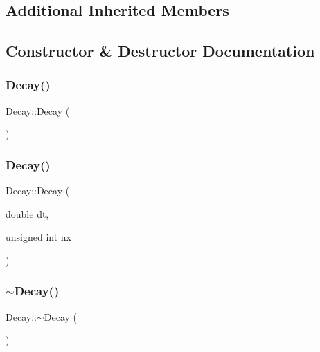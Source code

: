 \subsection*{Additional Inherited Members}


\subsection{Constructor \& Destructor Documentation}
\mbox{\label{class_decay_a603fb8ea4172c2c80c8779ad301b6a4f}} 
\subsubsection{\texorpdfstring{Decay()}{Decay()}\hspace{0.1cm}{\footnotesize\ttfamily [1/2]}}
{\footnotesize\ttfamily Decay\+::\+Decay (\begin{DoxyParamCaption}{ }\end{DoxyParamCaption})}

\mbox{\label{class_decay_a694e3127e3dd89affb983e9565781062}} 
\subsubsection{\texorpdfstring{Decay()}{Decay()}\hspace{0.1cm}{\footnotesize\ttfamily [2/2]}}
{\footnotesize\ttfamily Decay\+::\+Decay (\begin{DoxyParamCaption}\item[{double}]{dt,  }\item[{unsigned int}]{nx }\end{DoxyParamCaption})}

\mbox{\label{class_decay_a25561e44ddc6acc39078d1a3864d2289}} 
\subsubsection{\texorpdfstring{$\sim$\+Decay()}{~Decay()}}
{\footnotesize\ttfamily Decay\+::$\sim$\+Decay (\begin{DoxyParamCaption}{ }\end{DoxyParamCaption})\hspace{0.3cm}{\ttfamily [inline]}}



